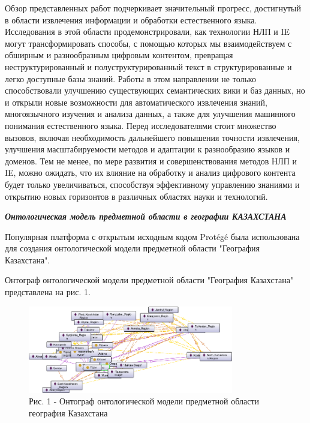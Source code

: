 \begin{multicols}{2}
Обзор представленных работ подчеркивает значительный прогресс,
достигнутый в области извлечения информации и обработки естественного
языка. Исследования в этой области продемонстрировали, как технологии
НЛП и IE могут трансформировать способы, с помощью которых мы
взаимодействуем с обширным и разнообразным цифровым контентом, превращая
неструктурированный и полуструктурированный текст в структурированные и
легко доступные базы знаний. Работы в этом направлении не только
способствовали улучшению существующих семантических вики и баз данных,
но и открыли новые возможности для автоматического извлечения знаний,
многоязычного изучения и анализа данных, а также для улучшения машинного
понимания естественного языка. Перед исследователями стоит множество
вызовов, включая необходимость дальнейшего повышения точности
извлечения, улучшения масштабируемости методов и адаптации к
разнообразию языков и доменов. Тем не менее, по мере развития и
совершенствования методов НЛП и IE, можно ожидать, что их влияние на
обработку и анализ цифрового контента будет только увеличиваться,
способствуя эффективному управлению знаниями и открытию новых горизонтов
в различных областях науки и технологий.

\emph{{\bfseries Онтологическая модель предметной области в географии
КАЗАХСТАНА}}

Популярная платформа с открытым исходным кодом Protégé была использована
для создания онтологической модели предметной области "География
Казахстана".

Онтограф онтологической модели предметной области "География Казахстана"
представлена на рис. 1.
\end{multicols}

\begin{figure}[H]
	\centering
	\includegraphics[width=0.8\textwidth]{assets/38}
	\caption*{Рис. 1 - Онтограф онтологической модели предметной области география Казахстана}
\end{figure}

